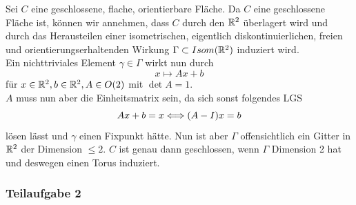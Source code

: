 \documentclass{book}
\begin{document}
\begin{Beweis}{}
	Sei $C$ eine geschlossene, flache, orientierbare Fläche. Da $C$ eine geschlossene Fläche ist, können wir annehmen, dass $C$ durch den $\mathbb{R}^2$ überlagert wird und durch das Herausteilen einer isometrischen, eigentlich diskontinuierlichen, freien und orientierungserhaltenden Wirkung $\Gamma \subset Isom(\mathbb{R}^2)$ induziert wird.\\
	Ein nichttriviales Element $\gamma \in \Gamma$ wirkt nun durch
	\[ x \mapsto Ax + b \]
	für $x \in \mathbb{R}^2, b\in \mathbb{R}^2, A \in O(2)$ mit $\det A = 1$.\\
	$A$ muss nun aber die Einheitsmatrix sein, da sich sonst folgendes LGS
	\[ Ax + b = x \overset{}{\Longleftrightarrow} (A - I)x = b \]
	lösen lässt und $\gamma$ einen Fixpunkt hätte. Nun ist aber $\Gamma$ offensichtlich ein Gitter in $\mathbb{R}^2$ der Dimension $\leq 2$. $C$ ist genau dann geschlossen, wenn $\Gamma$ Dimension 2 hat und deswegen einen Torus induziert.
\end{Beweis}


\subsubsection{Teilaufgabe 2}
\end{document}
